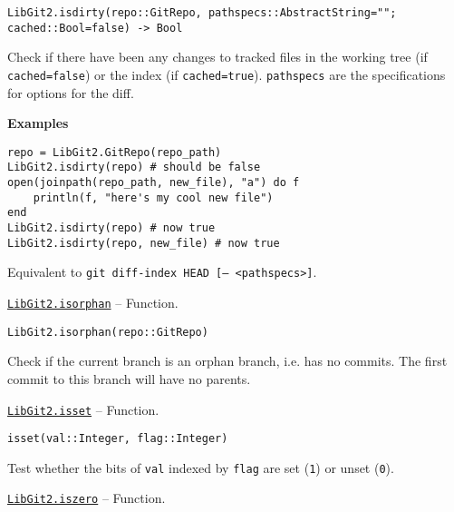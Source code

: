 \begin{adjustwidth}{2em}{0pt}


\begin{verbatim}
LibGit2.isdirty(repo::GitRepo, pathspecs::AbstractString=""; cached::Bool=false) -> Bool
\end{verbatim}

Check if there have been any changes to tracked files in the working tree (if \texttt{cached=false}) or the index (if \texttt{cached=true}). \texttt{pathspecs} are the specifications for options for the diff.

\textbf{Examples}


\begin{verbatim}
repo = LibGit2.GitRepo(repo_path)
LibGit2.isdirty(repo) # should be false
open(joinpath(repo_path, new_file), "a") do f
    println(f, "here's my cool new file")
end
LibGit2.isdirty(repo) # now true
LibGit2.isdirty(repo, new_file) # now true
\end{verbatim}

Equivalent to \texttt{git diff-index HEAD [-- <pathspecs>]}.



\end{adjustwidth}
\hypertarget{2361675915882834215}{} 
\hyperlink{2361675915882834215}{\texttt{LibGit2.isorphan}}  -- {Function.}

\begin{adjustwidth}{2em}{0pt}


\begin{verbatim}
LibGit2.isorphan(repo::GitRepo)
\end{verbatim}

Check if the current branch is an {\textquotedbl}orphan{\textquotedbl} branch, i.e. has no commits. The first commit to this branch will have no parents.



\end{adjustwidth}
\hypertarget{2310531182237663864}{} 
\hyperlink{2310531182237663864}{\texttt{LibGit2.isset}}  -- {Function.}

\begin{adjustwidth}{2em}{0pt}


\begin{verbatim}
isset(val::Integer, flag::Integer)
\end{verbatim}

Test whether the bits of \texttt{val} indexed by \texttt{flag} are set (\texttt{1}) or unset (\texttt{0}).



\end{adjustwidth}
\hypertarget{12794222535204600786}{} 
\hyperlink{12794222535204600786}{\texttt{LibGit2.iszero}}  -- {Function.}

